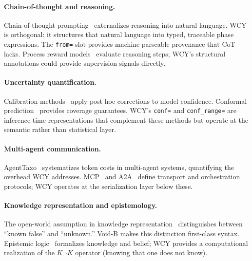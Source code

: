 \documentclass[11pt,a4paper]{article}
\begin{document}
\paragraph{Chain-of-thought and reasoning.}
Chain-of-thought prompting~\citep{wei2022cot} externalizes reasoning into natural language. WCY is orthogonal: it structures that natural language into typed, traceable phase expressions. The \texttt{from=} slot provides machine-parseable provenance that CoT lacks. Process reward models~\citep{lightman2023prm} evaluate reasoning steps; WCY's structural annotations could provide supervision signals directly.

\paragraph{Uncertainty quantification.}
Calibration methods~\citep{guo2017calibration} apply post-hoc corrections to model confidence. Conformal prediction~\citep{angelopoulos2023conformal} provides coverage guarantees. WCY's \texttt{conf=} and \texttt{conf\_range=} are inference-time representations that complement these methods but operate at the semantic rather than statistical layer.

\paragraph{Multi-agent communication.}
AgentTaxo~\citep{agenttaxo2025} systematizes token costs in multi-agent systems, quantifying the overhead WCY addresses. MCP~\citep{anthropic2024mcp} and A2A~\citep{google2025a2a} define transport and orchestration protocols; WCY operates at the serialization layer below these.

\paragraph{Knowledge representation and epistemology.}
The open-world assumption in knowledge representation~\citep{brachman1985kr} distinguishes between ``known false'' and ``unknown.'' Void-B makes this distinction first-class syntax. Epistemic logic~\citep{hintikka1962ke} formalizes knowledge and belief; WCY provides a computational realization of the $K\neg K$ operator (knowing that one does not know).
\end{document}
